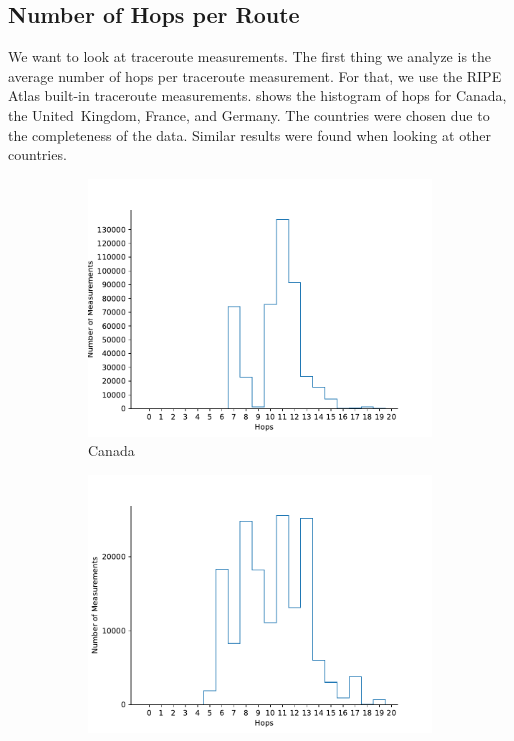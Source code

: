 \subsection{Number of Hops per Route}

We want to look at traceroute measurements. The first thing we analyze is the
average number of hops per traceroute measurement. For that, we use the RIPE
Atlas built-in traceroute measurements.  shows the
histogram of hops for Canada, the United~Kingdom, France, and Germany. The
countries were chosen due to the completeness of the data. Similar results were
found when looking at other countries.

\begin{figure}
	\centering
	\begin{subfigure}[b]{0.48\linewidth}
		\includegraphics[width=\linewidth]{chapters/4-results/traceroute/img/hops_CA.pdf}
		\caption{Canada}
	\end{subfigure}
	\begin{subfigure}[b]{0.48\linewidth}
		\includegraphics[width=\linewidth]{chapters/4-results/traceroute/img/hops_PH.pdf}

\end{subfigure}
\end{figure}
